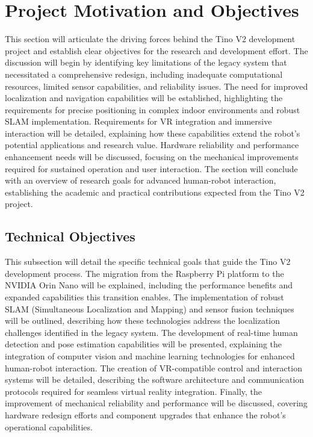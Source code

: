 \section{Project Motivation and Objectives}
This section will articulate the driving forces behind the Tino V2 development project and establish clear objectives for the research and development effort. The discussion will begin by identifying key limitations of the legacy system that necessitated a comprehensive redesign, including inadequate computational resources, limited sensor capabilities, and reliability issues. The need for improved localization and navigation capabilities will be established, highlighting the requirements for precise positioning in complex indoor environments and robust SLAM implementation. Requirements for VR integration and immersive interaction will be detailed, explaining how these capabilities extend the robot's potential applications and research value. Hardware reliability and performance enhancement needs will be discussed, focusing on the mechanical improvements required for sustained operation and user interaction. The section will conclude with an overview of research goals for advanced human-robot interaction, establishing the academic and practical contributions expected from the Tino V2 project.

\subsection{Technical Objectives}
This subsection will detail the specific technical goals that guide the Tino V2 development process. The migration from the Raspberry Pi platform to the NVIDIA Orin Nano will be explained, including the performance benefits and expanded capabilities this transition enables. The implementation of robust SLAM (Simultaneous Localization and Mapping) and sensor fusion techniques will be outlined, describing how these technologies address the localization challenges identified in the legacy system. The development of real-time human detection and pose estimation capabilities will be presented, explaining the integration of computer vision and machine learning technologies for enhanced human-robot interaction. The creation of VR-compatible control and interaction systems will be detailed, describing the software architecture and communication protocols required for seamless virtual reality integration. Finally, the improvement of mechanical reliability and performance will be discussed, covering hardware redesign efforts and component upgrades that enhance the robot's operational capabilities.

